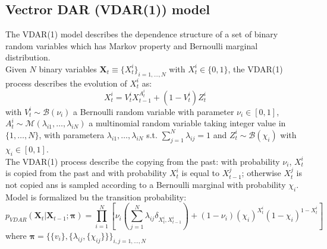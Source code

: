 \subsection{Vectror DAR (VDAR(1)) model}
The VDAR(1)  model describes the dependence structure of a set of binary random variables which has Markov property and Bernoulli marginal distribution.\\
Given $N$ binary variables $\mathbf{X}_t \equiv \{X_t^i\}_{i =1,\ldots,N}$ with $X_t^i \in \{0,1\}$, the VDAR(1) process describes the evolution of $X_t^i$ as:
\[
X_t^i =V_t^i X_{t-1}^{A_t^i} + (1-V_t^i)Z_t^i
\]
with $V_t^i \sim \mathcal{B}(\nu_i)$ a Bernoulli random variable with parameter $\nu_i \in [0,1]$, $A_t^i \sim \mathcal{M}(\lambda_{i1},\ldots,\lambda_{iN})$ a multinomial random variable taking integer value in $\{1,\ldots,N\}$, with parametera $\lambda_{i1},\ldots,\lambda_{iN}$ s.t. $\sum_{j =1}^N \lambda_{ij} =1$ and $Z_t^i \sim \mathcal{B}(\chi_i)$ with $\chi_i \in [0,1]$.\\
The VDAR(1) process describe the copying from the past: with probability $\nu_i$, $X_t^i$ is copied from the past and with probability $X_t^i$ is equal to $X^j_{t-1}$; otherwise $X^j_{t}$ is not copied ans is sampled according to a Bernoulli marginal with probability $\chi_i$. Model is formalized bu the transition probability:
\[
p_{VDAR}(\mathbf{X}_t | \mathbf{X}_{t-1}; \bm{\pi}) = \prod_{i=1}^N \left[\nu_i \left(\sum_{j =1}^N \lambda_{ij}\delta_{X^i_t,X^i_{t-1}}\right) + (1- \nu_i)(\chi_i)^{X_t^i}(1- \chi_i)^{1 - X^i_t}\right]
\]
where $\bm{\pi} = \{\{v_i\},\{\lambda_{ij}, \{\chi_{ij}\}\}\}_{i,j =1,\ldots,N}$
